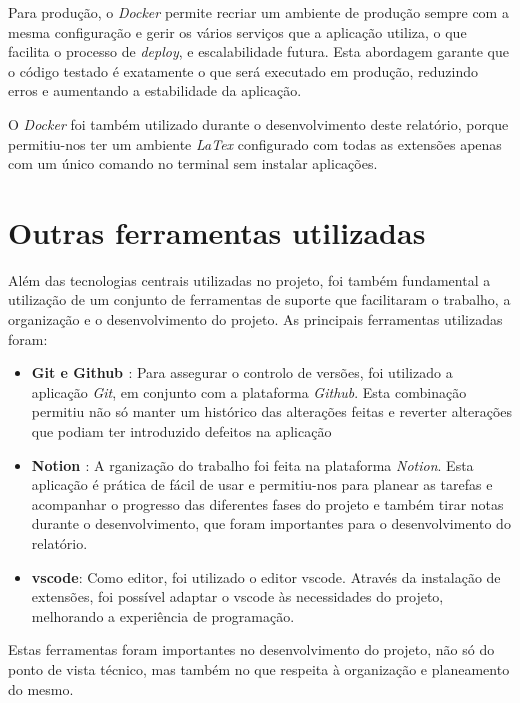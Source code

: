 Para produção, o \textit{Docker} permite recriar um ambiente de produção sempre com a mesma configuração e gerir os vários serviços que a aplicação utiliza, o que facilita o processo de \textit{deploy}, e escalabilidade futura. Esta abordagem garante que o código testado é exatamente o que será executado em produção, reduzindo erros e aumentando a estabilidade da aplicação.

O \textit{Docker} foi também utilizado durante o desenvolvimento deste relatório, porque permitiu-nos ter um ambiente \textit{LaTex} configurado com todas as extensões apenas com um único comando no terminal sem instalar aplicações.

\section{Outras ferramentas utilizadas}
\label{sec:tools}

Além das tecnologias centrais utilizadas no projeto, foi também fundamental a utilização de um conjunto de ferramentas de suporte que facilitaram o trabalho, a organização e o desenvolvimento do projeto. As principais ferramentas utilizadas foram:

\begin{itemize}
    \item \textbf{Git \cite{git} e Github \cite{github}}: Para assegurar o controlo de versões, foi utilizado a aplicação \textit{Git}, em conjunto com a plataforma \textit{Github}. Esta combinação permitiu não só manter um histórico das alterações feitas e reverter alterações que podiam ter introduzido defeitos na aplicação

    \item \textbf{Notion \cite{notion}}: A rganização do trabalho foi feita na plataforma \textit{Notion}. Esta aplicação é prática de fácil de usar e permitiu-nos para planear as tarefas e acompanhar o progresso das diferentes fases do projeto e também tirar notas durante o desenvolvimento, que foram importantes para o desenvolvimento do relatório.

    \item \textbf{\gls{vscode}\cite{vscode}}: Como editor, foi utilizado o editor \gls{vscode}. Através da instalação de extensões, foi possível adaptar o \gls{vscode} às necessidades do projeto, melhorando a experiência de programação.
\end{itemize}

Estas ferramentas foram importantes no desenvolvimento do projeto, não só do ponto de vista técnico, mas também no que respeita à organização e planeamento do mesmo.
